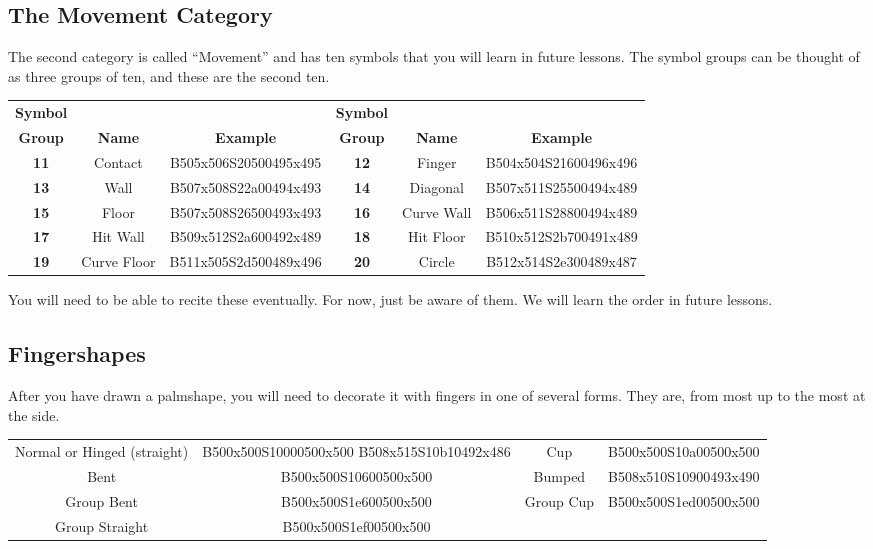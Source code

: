 \documentclass{article}
\begin{document}
\subsection{The Movement Category}

The second category is called ``Movement'' and has ten symbols that you will learn in future lessons.
The symbol groups can be thought of as three groups of ten, and these are the second ten.

\begin{center}
\begin{tabular}{ccc@{\hskip 5mm}ccc}
\textbf{Symbol}&&&\textbf{Symbol}\\
\textbf{Group}&\textbf{Name}&\textbf{Example}&\textbf{Group}&\textbf{Name}&\textbf{Example}\\
\textbf{11}&Contact    &B505x506S20500495x495&\textbf{12}&Finger    &B504x504S21600496x496\\
\textbf{13}&Wall       &B507x508S22a00494x493&\textbf{14}&Diagonal  &B507x511S25500494x489\\
\textbf{15}&Floor      &B507x508S26500493x493&\textbf{16}&Curve Wall&B506x511S28800494x489\\
\textbf{17}&Hit Wall   &B509x512S2a600492x489&\textbf{18}&Hit Floor &B510x512S2b700491x489\\
\textbf{19}&Curve Floor&B511x505S2d500489x496&\textbf{20}&Circle    &B512x514S2e300489x487\\
\end{tabular}
\end{center}

You will need to be able to recite these eventually.
For now, just be aware of them.
We will learn the order in future lessons.

\subsection{Fingershapes}

After you have drawn a palmshape, you will need to decorate it with fingers in one of several forms.
They are, from most up to the most at the side.

\begin{center}
\begin{tabular}{cccc}
Normal or Hinged (straight)&B500x500S10000500x500 B508x515S10b10492x486&Cup      &B500x500S10a00500x500\\
Bent                       &B500x500S10600500x500                      &Bumped   &B508x510S10900493x490\\
Group Bent                 &B500x500S1e600500x500                      &Group Cup&B500x500S1ed00500x500\\
Group Straight             &B500x500S1ef00500x500\\
\end{tabular}
\end{center}
\end{document}
